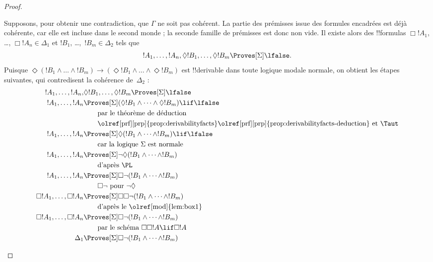 \documentclass[../../../include/open-logic-section]{subfiles}
\begin{document}
\begin{proof}
\begin{enumerate}
    Supposons, pour obtenir une contradiction, que $\Gamma$ ne soit pas
    cohérent. La partie des prémisses issue des formules encadrées est
    déjà cohérente, car elle est incluse dans le second monde ; la
    seconde famille de prémisses est donc non vide. Il existe alors des
    !!{formula}s $\Box!A_1$, \dots,
    $\Box!A_n \in \Delta_1$ et $!B_1$, \dots,~$!B_m \in \Delta_2$ tels
    que \[!A_1, \dots,
    !A_n, \Diamond!B_1, \dots, \Diamond!B_m \Proves[\Sigma]
    \lfalse.\] Puisque $\Diamond (!B_1 \land \dots \land !B_m) \to
    (\Diamond!B_1 \land \dots \land \Diamond!B_m)$ est !!{derivable}
    dans toute logique modale normale, on obtient les étapes suivantes,
    qui contredisent la cohérence de~$\Delta_2$ :
    \begin{align*}
      !A_1, \dots, !A_n, & \Diamond!B_1, \dots,
      \Diamond!B_m \Proves[\Sigma] \lfalse \\
      !A_1, \dots,!A_n & \Proves[\Sigma] (\Diamond!B_1 \land
      \dots \land \Diamond!B_m) \lif \lfalse\\
      & \qquad\text{par le théorème de déduction}\\
      & \qquad\text{\olref[prf][prp]{prop:derivabilityfacts}\olref[prf][prp]{prop:derivabilityfacts-deduction} et \Taut} \\
      !A_1, \dots,!A_n & \Proves[\Sigma]
      \Diamond(!B_1 \land
      \dots \land !B_m) \lif \lfalse\\
      & \qquad \text{car la logique~$\Sigma$ est normale} \\
      !A_1, \dots,!A_n & \Proves[\Sigma]
      \lnot\Diamond (!B_1 \land \dots \land !B_m)\\
      & \qquad\text{d'après \PL} \\
      !A_1, \dots,!A_n & \Proves[\Sigma]
      \Box\lnot (!B_1 \land \dots \land !B_m)\\
      & \qquad\text{$\Box\lnot$ pour $\lnot\Diamond$} \\
      \Box!A_1, \dots,\Box!A_n
      & \Proves[\Sigma] \Box\Box \lnot (!B_1 \land \dots \land !B_m)\\
      & \qquad\text{d'après le \olref[mod]{lem:box1}} \\
      \Box!A_1, \dots,\Box!A_n
      & \Proves[\Sigma]
      \Box\lnot (!B_1 \land \dots \land !B_m)\\
      &\qquad\text{par le schéma $\Box\Box!A \lif \Box!A$} \\
      \Delta_1 & \Proves[\Sigma]
      \Box\lnot (!B_1 \land \dots \land !B_m)\\

\end{align*}
\end{enumerate}
\end{proof}
\end{document}
